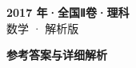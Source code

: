\documentclass[zihao=-4, a4paper]{ctexart}
\begin{document}
\begin{center}
  {\Large\bfseries 2017 年·全国Ⅱ卷·理科}\\[4pt]
  {\large 数学 · 解析版}
\end{center}
\medskip
{}

\clearpage
{}
\begin{center}{\Large\bfseries 参考答案与详细解析}\end{center}
\medskip

\end{document}
